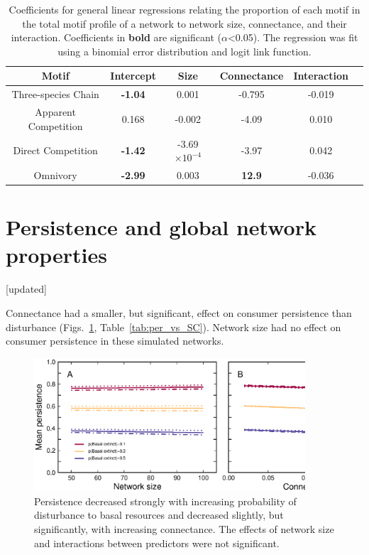 \documentclass[12pt]{article}
\begin{document}
\begin{spacing}{2.0}
     \begin{table}[hb!]
        \centering
        \caption{Coefficients for general linear regressions relating the proportion of each motif in the total motif profile of a network to network size, connectance, and their interaction. Coefficients in \textbf{bold} are significant ($\alpha$\textless0.05). The regression was fit using a binomial error distribution and logit link function.}
       \label{network_prop_lms}
       \begin{tabular}{c|c c c c c}
            Motif & Intercept & Size & Connectance & Interaction \\
            \hline
            Three-species Chain & \textbf{-1.04} & 0.001 & -0.795 & -0.019 \\
            Apparent Competition & 0.168 & -0.002 & -4.09 & 0.010 \\
            Direct Competition & \textbf{-1.42} & -3.69$\times10^{-4}$ & -3.97 & 0.042 \\
            Omnivory & \textbf{-2.99} & 0.003 & \textbf{12.9} & -0.036\\
            \hline
            \end{tabular}
    \end{table}        
\clearpage
    
            

\section{Persistence and global network properties} [updated]

    Connectance had a smaller, but significant, effect on consumer persistence than disturbance (Figs.~\ref{fig:lm_CS}, Table~\ref{tab:per_vs_SC}).
    Network size had no effect on consumer persistence in these simulated networks.

    \begin{figure}[hb!]
        \centering
        \includegraphics[width=0.9\textwidth]{figures/persistence_vs_SC_lm.eps}
        \caption{Persistence decreased strongly with increasing probability of disturbance to basal resources and decreased slightly, but significantly, with increasing connectance. The effects of network size and interactions between predictors were not significant. }
        \label{fig:lm_CS}
    \end{figure}




\end{spacing}
\end{document}
